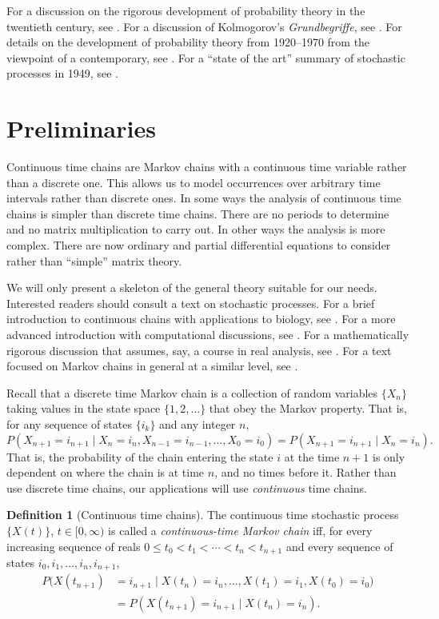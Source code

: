 \documentclass[12pt]{article}
\theoremstyle{definition}
\newtheorem{defn}{Definition}
\begin{document}
For a discussion on the rigorous development of probability theory in the
twentieth century, see \cite{doob1996development}. For a discussion of
Kolmogorov's \emph{Grundbegriffe}, see \cite{shafer2006sources}. For details on
the development of probability theory from 1920--1970 from the viewpoint of a
contemporary, see \cite{cramer1976century}. For a ``state of the art'' summary
of stochastic processes in 1949, see \cite{feller1949theory}.

\section{Preliminaries}
\label{sec:preliminaries}

Continuous time chains are Markov chains with a continuous time variable rather
than a discrete one. This allows us to model occurrences over arbitrary time
intervals rather than discrete ones. In some ways the analysis of continuous
time chains is simpler than discrete time chains. There are no periods to
determine and no matrix multiplication to carry out. In other ways the analysis
is more complex. There are now ordinary and partial differential equations to
consider rather than ``simple'' matrix theory.

We will only present a skeleton of the general theory suitable for our needs.
Interested readers should consult a text on stochastic processes. For a brief
introduction to continuous chains with applications to biology, see
\citet{allen2010introduction}. For a more advanced introduction with
computational discussions, see \citet{kao1997introduction}. For a
mathematically rigorous discussion that assumes, say, a course in real
analysis, see \citet{berger2012introduction}. For a text focused on Markov
chains in general at a similar level, see \citet{bremaud1998markov}.

Recall that a discrete time Markov chain is a collection of random variables
$\{X_n\}$ taking values in the state space $\{1, 2, \dots\}$ that obey the
Markov property. That is, for any sequence of states $\{i_k\}$ and any integer
$n$, $$P(X_{n + 1} = i_{n + 1} \mid X_n = i_n, X_{n - 1} = i_{n - 1}, \dots,
X_0 = i_0) = P(X_{n + 1} = i_{n + 1} \mid X_n = i_n).$$ That is, the
probability of the chain entering the state $i$ at the time $n + 1$ is only
dependent on where the chain is at time $n$, and no times before it. Rather
than use discrete time chains, our applications will use \emph{continuous} time
chains.

\begin{defn}[Continuous time chains]
    \label{defn:continuous-chain}
    The continuous time stochastic process $\{X(t)\}$, $t \in [0, \infty)$ is
    called a \emph{continuous-time Markov chain} iff, for every increasing
    sequence of reals $0 \leq t_0 < t_1 < \cdots < t_n < t_{n + 1}$ and every
    sequence of states $i_0, i_1, \dots, i_n, i_{n + 1}$,
    \begin{align*}
    P(X(t_{n + 1}) &= i_{n + 1} \mid X(t_n) = i_n, \dots, X(t_1) = i_1, X(t_0)
    = i_0) \\
    &= P(X(t_{n + 1}) = i_{n + 1} \mid X(t_n) = i_n).
    \end{align*}
\end{defn}
\end{document}
